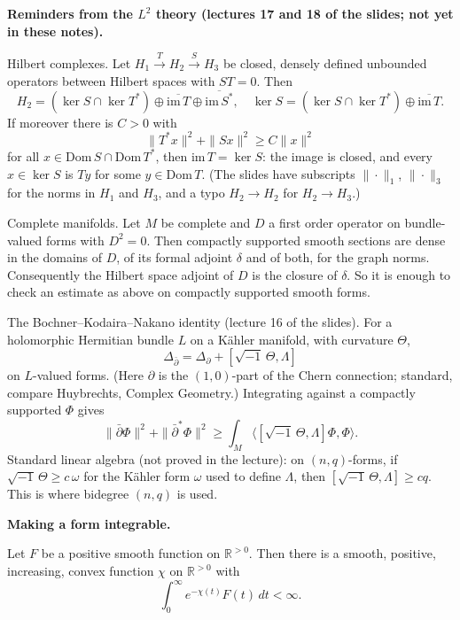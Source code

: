 \medskip\noindent
{\bf Reminders from the $L^2$ theory
(lectures 17 and 18 of the slides; not yet in
these notes).}

Hilbert complexes. Let
$H_1\xrightarrow{T}H_2\xrightarrow{S}H_3$ be
closed, densely defined unbounded operators
between Hilbert spaces with $ST=0$. Then
$$
H_2=(\ker S\cap\ker T^*)
\oplus\overline{\mathrm{im}\,T}
\oplus\overline{\mathrm{im}\,S^*},
\quad
\ker S=(\ker S\cap\ker T^*)
\oplus\overline{\mathrm{im}\,T}.
$$
If moreover there is $C>0$ with
$$
\|T^*x\|^2+\|Sx\|^2\geq C\|x\|^2
$$
for all
$x\in\mathrm{Dom}\,S\cap\mathrm{Dom}\,T^*$,
then $\mathrm{im}\,T=\ker S$: the image is
closed, and every $x\in\ker S$ is $Ty$ for
some $y\in\mathrm{Dom}\,T$. (The slides have
subscripts $\|\cdot\|_1$, $\|\cdot\|_3$ for
the norms in $H_1$ and $H_3$, and a typo
$H_2\to H_2$ for $H_2\to H_3$.)

Complete manifolds. Let $M$ be complete and
$D$ a first order operator on bundle-valued
forms with $D^2=0$. Then compactly supported
smooth sections are dense in the domains of
$D$, of its formal adjoint $\delta$ and of
both, for the graph norms. Consequently the
Hilbert space adjoint of $D$ is the closure
of $\delta$. So it is enough to check an
estimate as above on compactly supported
smooth forms.

The Bochner--Kodaira--Nakano identity
(lecture 16 of the slides). For a holomorphic
Hermitian bundle $L$ on a K\"ahler manifold,
with curvature $\Theta$,
$$
\Delta_{\bar\partial}=\Delta_{\partial}
+[\sqrt{-1}\,\Theta,\Lambda]
$$
on $L$-valued forms. (Here $\partial$ is the
$(1,0)$-part of the Chern connection;
standard, compare
Huybrechts, Complex Geometry.) Integrating
against a compactly supported $\Phi$ gives
$$
\|\bar\partial\Phi\|^2
+\|\bar\partial^*\Phi\|^2\geq
\int_M\langle[\sqrt{-1}\,\Theta,\Lambda]\Phi
,\Phi\rangle .
$$
Standard linear algebra (not proved in the
lecture): on $(n,q)$-forms, if
$\sqrt{-1}\,\Theta\geq c\,\omega$ for the
K\"ahler form $\omega$ used to define
$\Lambda$, then
$[\sqrt{-1}\,\Theta,\Lambda]\geq cq$. This is
where bidegree $(n,q)$ is used.

\medskip\noindent
{\bf Making a form integrable.}

\begin{exercise}
\label{exercise-convex-weight-integrable}
Let $F$ be a positive smooth function on
$\mathbb{R}^{>0}$. Then there is a smooth,
positive, increasing, convex function $\chi$
on $\mathbb{R}^{>0}$ with
$$
\int_0^\infty e^{-\chi(t)}F(t)\,dt<\infty .
$$
\end{exercise}


